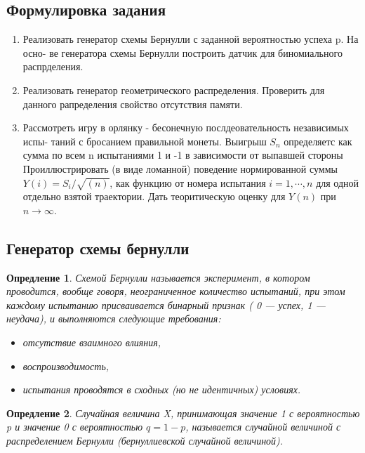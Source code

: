 \documentclass[11pt]{article}
\newtheorem{definition}{Опредление}
\numberwithin{equation}{section}
\begin{document}
\subsection{Формулировка задания}
\begin{enumerate}
  \item Реализовать генератор схемы Бернулли с заданной вероятностью успеха p. На осно- ве генератора схемы Бернулли построить датчик для биномиального распрделения.
  \item Реализовать генератор геометрического распределения. Проверить для данного рапределения свойство отсутствия памяти.
  \item Рассмотреть игру в орлянку - бесонечную послдеовательность независимых испы- таний с бросанием правильной монеты. Выигрыш $S_n$ определяетс как сумма по всем n испытаниями 1 и -1 в зависимости от выпавшей стороны Проиллюстрировать (в виде ломанной) поведение нормированной суммы $Y (i) = S_i/ \sqrt{(n)}$, как функцию от номера испытания $i = 1, \cdots,n$ для одной отдельно взятой траектории. Дать теоритическую оценку для $Y (n)$ при $n \to \infty$.
\end{enumerate}
\subsection{Генератор схемы бернулли }

\begin{definition}\label{4.23p154}
Схемой Бернулли называется эксперимент, в котором проводится, вообще говоря, неограниченное количество испытаний, при этом каждому испытанию присваивается бинарный признак ( 0 — успех, 1 — неудача), и выполняются следующие требования:
\begin{itemize}
  \item отсутствие взаимного влияния,
  \item воспроизводимость,
  \item испытания проводятся в сходных (но не идентичных) условиях.
\end{itemize}
\end{definition}
\begin{definition}
  Случайная величина X, принимающая значение 1 с вероятностью p и значение 0 с вероятностью $q = 1−p$, называется случайной величиной с распределением Бернулли (бернуллиевской случайной величиной).
\end{definition}
\end{document}
